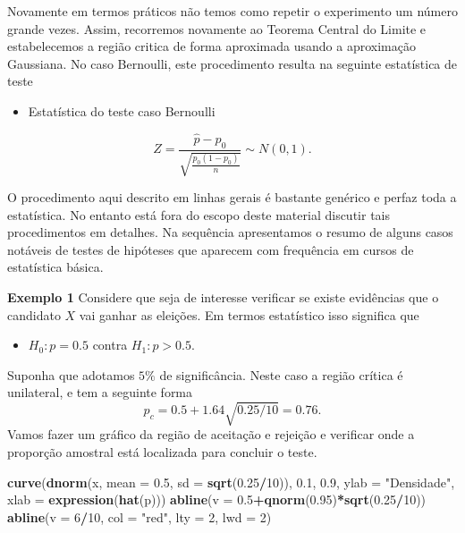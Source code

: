 \documentclass[10pt,a4paper]{book}
\newenvironment{Shaded}{\begin{snugshade}}{\end{snugshade}}
\newcommand{\KeywordTok}[1]{\textcolor[rgb]{0.13,0.29,0.53}{\textbf{#1}}}
\newcommand{\DataTypeTok}[1]{\textcolor[rgb]{0.13,0.29,0.53}{#1}}
\newcommand{\DecValTok}[1]{\textcolor[rgb]{0.00,0.00,0.81}{#1}}
\newcommand{\FloatTok}[1]{\textcolor[rgb]{0.00,0.00,0.81}{#1}}
\newcommand{\StringTok}[1]{\textcolor[rgb]{0.31,0.60,0.02}{#1}}
\newcommand{\OperatorTok}[1]{\textcolor[rgb]{0.81,0.36,0.00}{\textbf{#1}}}
\newcommand{\NormalTok}[1]{#1}
\providecommand{\tightlist}{%
  \setlength{\itemsep}{0pt}\setlength{\parskip}{0pt}}
\begin{document}
Novamente em termos práticos não temos como repetir o experimento um
número grande vezes. Assim, recorremos novamente ao Teorema Central do
Limite e estabelecemos a região critica de forma aproximada usando a
aproximação Gaussiana. No caso Bernoulli, este procedimento resulta na
seguinte estatística de teste

\begin{itemize}
\tightlist
\item
  Estatística do teste caso Bernoulli
\end{itemize}

\[
Z = \frac{\hat{p} - p_0}{\sqrt{\frac{p_0(1-p_0)}{n}}} \sim N(0,1).
\]

O procedimento aqui descrito em linhas gerais é bastante genérico e
perfaz toda a estatística. No entanto está fora do escopo deste material
discutir tais procedimentos em detalhes. Na sequência apresentamos o
resumo de alguns casos notáveis de testes de hipóteses que aparecem com
frequência em cursos de estatística básica.

\textbf{Exemplo 1} Considere que seja de interesse verificar se existe
evidências que o candidato \(X\) vai ganhar as eleições. Em termos
estatístico isso significa que

\begin{itemize}
\tightlist
\item
  \(H_0: p = 0.5\) contra \(H_1:p > 0.5.\)
\end{itemize}

Suponha que adotamos \(5\%\) de significância. Neste caso a região
crítica é unilateral, e tem a seguinte forma
\[p_c = 0.5 + 1.64\sqrt{0.25/10} = 0.76.\] Vamos fazer um gráfico da
região de aceitação e rejeição e verificar onde a proporção amostral
está localizada para concluir o teste.

\begin{Shaded}
\begin{Highlighting}[]
\KeywordTok{curve}\NormalTok{(}\KeywordTok{dnorm}\NormalTok{(x, }\DataTypeTok{mean =} \FloatTok{0.5}\NormalTok{, }\DataTypeTok{sd =} \KeywordTok{sqrt}\NormalTok{(}\FloatTok{0.25}\OperatorTok{/}\DecValTok{10}\NormalTok{)), }\FloatTok{0.1}\NormalTok{, }\FloatTok{0.9}\NormalTok{, }
      \DataTypeTok{ylab =} \StringTok{"Densidade"}\NormalTok{, }\DataTypeTok{xlab =} \KeywordTok{expression}\NormalTok{(}\KeywordTok{hat}\NormalTok{(p)))}
\KeywordTok{abline}\NormalTok{(}\DataTypeTok{v =} \FloatTok{0.5}\OperatorTok{+}\KeywordTok{qnorm}\NormalTok{(}\FloatTok{0.95}\NormalTok{)}\OperatorTok{*}\KeywordTok{sqrt}\NormalTok{(}\FloatTok{0.25}\OperatorTok{/}\DecValTok{10}\NormalTok{))}
\KeywordTok{abline}\NormalTok{(}\DataTypeTok{v =} \DecValTok{6}\OperatorTok{/}\DecValTok{10}\NormalTok{, }\DataTypeTok{col =} \StringTok{"red"}\NormalTok{, }\DataTypeTok{lty =} \DecValTok{2}\NormalTok{, }\DataTypeTok{lwd =} \DecValTok{2}\NormalTok{)}
\end{Highlighting}
\end{Shaded}
\end{document}
